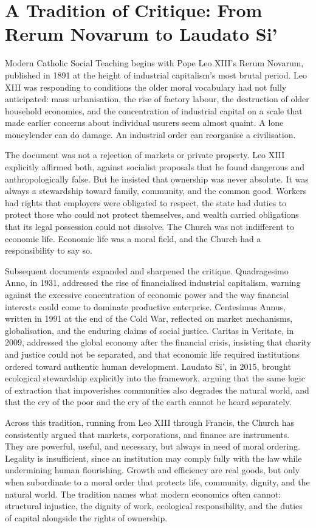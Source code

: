 \documentclass[11pt,a4paper,oneside]{book}
\begin{document}
\section*{A Tradition of Critique: From Rerum Novarum to Laudato Si'}

Modern Catholic Social Teaching begins with Pope Leo XIII's Rerum Novarum, published in 1891 at the height of industrial capitalism's most brutal period. Leo XIII was responding to conditions the older moral vocabulary had not fully anticipated: mass urbanisation, the rise of factory labour, the destruction of older household economies, and the concentration of industrial capital on a scale that made earlier concerns about individual usurers seem almost quaint. A lone moneylender can do damage. An industrial order can reorganise a civilisation.

The document was not a rejection of markets or private property. Leo XIII explicitly affirmed both, against socialist proposals that he found dangerous and anthropologically false. But he insisted that ownership was never absolute. It was always a stewardship toward family, community, and the common good. Workers had rights that employers were obligated to respect, the state had duties to protect those who could not protect themselves, and wealth carried obligations that its legal possession could not dissolve. The Church was not indifferent to economic life. Economic life was a moral field, and the Church had a responsibility to say so.

Subsequent documents expanded and sharpened the critique. Quadragesimo Anno, in 1931, addressed the rise of financialised industrial capitalism, warning against the excessive concentration of economic power and the way financial interests could come to dominate productive enterprise. Centesimus Annus, written in 1991 at the end of the Cold War, reflected on market mechanisms, globalisation, and the enduring claims of social justice. Caritas in Veritate, in 2009, addressed the global economy after the financial crisis, insisting that charity and justice could not be separated, and that economic life required institutions ordered toward authentic human development. Laudato Si', in 2015, brought ecological stewardship explicitly into the framework, arguing that the same logic of extraction that impoverishes communities also degrades the natural world, and that the cry of the poor and the cry of the earth cannot be heard separately.

Across this tradition, running from Leo XIII through Francis, the Church has consistently argued that markets, corporations, and finance are instruments. They are powerful, useful, and necessary, but always in need of moral ordering. Legality is insufficient, since an institution may comply fully with the law while undermining human flourishing. Growth and efficiency are real goods, but only when subordinate to a moral order that protects life, community, dignity, and the natural world. The tradition names what modern economics often cannot: structural injustice, the dignity of work, ecological responsibility, and the duties of capital alongside the rights of ownership.
\end{document}
